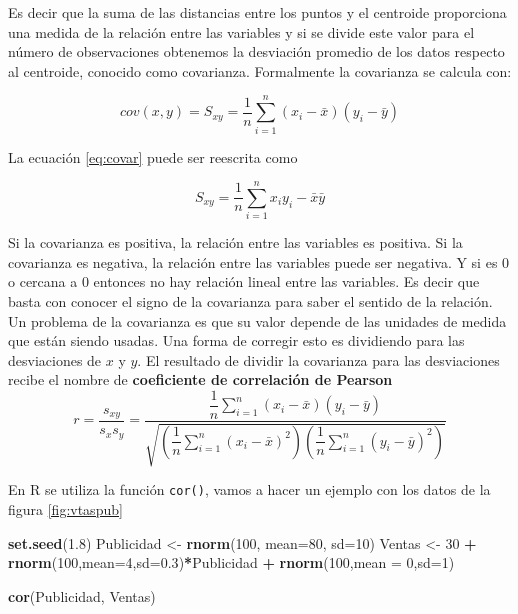 \documentclass[]{book}
\newenvironment{Shaded}{\begin{snugshade}}{\end{snugshade}}
\newcommand{\DataTypeTok}[1]{\textcolor[rgb]{0.13,0.29,0.53}{#1}}
\newcommand{\DecValTok}[1]{\textcolor[rgb]{0.00,0.00,0.81}{#1}}
\newcommand{\FloatTok}[1]{\textcolor[rgb]{0.00,0.00,0.81}{#1}}
\newcommand{\KeywordTok}[1]{\textcolor[rgb]{0.13,0.29,0.53}{\textbf{#1}}}
\newcommand{\NormalTok}[1]{#1}
\newcommand{\OperatorTok}[1]{\textcolor[rgb]{0.81,0.36,0.00}{\textbf{#1}}}
\newcommand{\StringTok}[1]{\textcolor[rgb]{0.31,0.60,0.02}{#1}}
\begin{document}
Es decir que la suma de las distancias entre los puntos y el centroide proporciona una medida de la relación entre las variables y si se divide este valor para el número de observaciones obtenemos la desviación promedio de los datos respecto al centroide, conocido como covarianza. Formalmente la covarianza se calcula con:

\begin{equation} 
  cov(x,y) = S_{xy} = \dfrac{1}{n} \sum_{i=1}^{n}\left(x_i-\bar{x}\right)\left(y_i-\bar{y}\right)
  \label{eq:covar}
\end{equation}

La ecuación \eqref{eq:covar} puede ser reescrita como

\begin{equation} 
  S_{xy} = \dfrac{1}{n}\sum_{i=1}^{n}{x_iy_i}-\bar{x}\bar{y}
  \label{eq:covar2}
\end{equation}

Si la covarianza es positiva, la relación entre las variables es positiva. Si la covarianza es negativa, la relación entre las variables puede ser negativa. Y si es \(0\) o cercana a \(0\) entonces no hay relación lineal entre las variables. Es decir que basta con conocer el signo de la covarianza para saber el sentido de la relación. Un problema de la covarianza es que su valor depende de las unidades de medida que están siendo usadas. Una forma de corregir esto es dividiendo para las desviaciones de \(x\) y \(y\). El resultado de dividir la covarianza para las desviaciones recibe el nombre de \textbf{coeficiente de correlación de Pearson}
\begin{equation} 
  r=\dfrac{s_{xy}}{s_xs_y}=\dfrac{\dfrac{1}{n} \sum_{i=1}^{n}\left(x_i-\bar{x}\right)\left(y_i-\bar{y}\right)}{\sqrt{\left(\dfrac{1}{n} \sum_{i=1}^{n}\left(x_i-\bar{x}\right)^2\right)\left(\dfrac{1}{n} \sum_{i=1}^{n}\left(y_i-\bar{y}\right)^2\right)}}
  \label{eq:covar3}
\end{equation}

En R se utiliza la función \texttt{cor()}, vamos a hacer un ejemplo con los datos de la figura \ref{fig:vtaspub}

\begin{Shaded}
\begin{Highlighting}[]
\KeywordTok{set.seed}\NormalTok{(}\FloatTok{1.8}\NormalTok{)}
\NormalTok{Publicidad <-}\StringTok{ }\KeywordTok{rnorm}\NormalTok{(}\DecValTok{100}\NormalTok{, }\DataTypeTok{mean=}\DecValTok{80}\NormalTok{, }\DataTypeTok{sd=}\DecValTok{10}\NormalTok{)}
\NormalTok{Ventas <-}\StringTok{ }\DecValTok{30} \OperatorTok{+}\StringTok{ }\KeywordTok{rnorm}\NormalTok{(}\DecValTok{100}\NormalTok{,}\DataTypeTok{mean=}\DecValTok{4}\NormalTok{,}\DataTypeTok{sd=}\FloatTok{0.3}\NormalTok{)}\OperatorTok{*}\NormalTok{Publicidad }\OperatorTok{+}\StringTok{ }\KeywordTok{rnorm}\NormalTok{(}\DecValTok{100}\NormalTok{,}\DataTypeTok{mean =} \DecValTok{0}\NormalTok{,}\DataTypeTok{sd=}\DecValTok{1}\NormalTok{)}

\KeywordTok{cor}\NormalTok{(Publicidad, Ventas)}
\end{Highlighting}
\end{Shaded}
\end{document}
